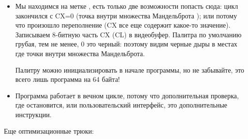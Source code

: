 \begin{itemize}
\begin{itemize}
Мы здесь экономим немного места, не загружая другое значение в регистр CX.

     \item Здесь используется  вместо , потому что мы работаем с знаковыми значениями:
помните, что координаты 0,0 должны быть где-то рядом с центром экрана.

Тоже самое и с  (арифметический сдвиг для знаковых значений): она используется вместо .


     \item Еще одна идея\EMDASH{}это упростить проверку пределов.
Нам бы пришлось проверять пару координат, т.е. две переменных.
Что делает автор это трижды проверяет на переполнение: две операции возведения в квадрат и одно 
прибавление.
Действительно, мы ведь используем 16-битные регистры, содержащие знаковые значения в пределах
 -32768..32767, так что
если любая из координат больше чем 32767 в процессе умножения, точка однозначно вышла за пределы,
и мы переходим на метку .


     \item Здесь также имеется деление на 64 (при помощи инструкции SAR). 64 задает масштаб.

Попробуйте увеличить значение и вы получите более увеличенную картинку, или уменьшить для
меньшей.


    \end{itemize}

\item Мы находимся на метке , есть только две возможности
попасть сюда: 
цикл закончился с CX=0 (точка внутри множества Мандельброта
); или потому что произошло переполнение (CX все еще содержит 
какое-то значение).
Записываем 8-битную часть CX (CL) в видеобуфер.
Палитра по умолчанию грубая, тем не менее, 0 это черный: поэтому видим черные дыры в местах где точки
внутри множества Мандельброта.

Палитру можно инициализировать в начале программы, но не забывайте, это всего лишь программа на 64 
байта!

\item Программа работает в вечном цикле, потому что дополнительная проверка, где остановится, 
или пользовательский интерфейс, это дополнительные инструкции.

\end{itemize}

Еще оптимизационные трюки:

